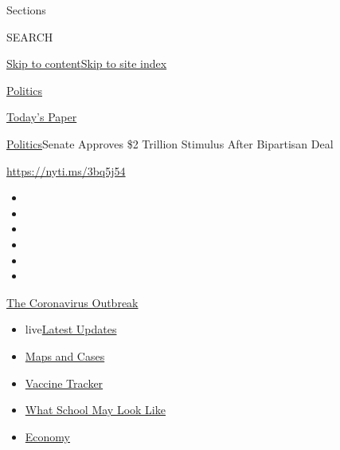 Sections

SEARCH

\protect\hyperlink{site-content}{Skip to
content}\protect\hyperlink{site-index}{Skip to site index}

\href{https://www.nytimes.com/section/politics}{Politics}

\href{https://myaccount.nytimes.com/auth/login?response_type=cookie\&client_id=vi}{}

\href{https://www.nytimes.com/section/todayspaper}{Today's Paper}

\href{/section/politics}{Politics}\textbar{}Senate Approves \$2 Trillion
Stimulus After Bipartisan Deal

\url{https://nyti.ms/3bq5j54}

\begin{itemize}
\item
\item
\item
\item
\item
\item
\end{itemize}

\href{https://www.nytimes.com/news-event/coronavirus?action=click\&pgtype=Article\&state=default\&region=TOP_BANNER\&context=storylines_menu}{The
Coronavirus Outbreak}

\begin{itemize}
\tightlist
\item
  live\href{https://www.nytimes.com/2020/08/01/world/coronavirus-covid-19.html?action=click\&pgtype=Article\&state=default\&region=TOP_BANNER\&context=storylines_menu}{Latest
  Updates}
\item
  \href{https://www.nytimes.com/interactive/2020/us/coronavirus-us-cases.html?action=click\&pgtype=Article\&state=default\&region=TOP_BANNER\&context=storylines_menu}{Maps
  and Cases}
\item
  \href{https://www.nytimes.com/interactive/2020/science/coronavirus-vaccine-tracker.html?action=click\&pgtype=Article\&state=default\&region=TOP_BANNER\&context=storylines_menu}{Vaccine
  Tracker}
\item
  \href{https://www.nytimes.com/interactive/2020/07/29/us/schools-reopening-coronavirus.html?action=click\&pgtype=Article\&state=default\&region=TOP_BANNER\&context=storylines_menu}{What
  School May Look Like}
\item
  \href{https://www.nytimes.com/live/2020/07/31/business/stock-market-today-coronavirus?action=click\&pgtype=Article\&state=default\&region=TOP_BANNER\&context=storylines_menu}{Economy}
\end{itemize}

